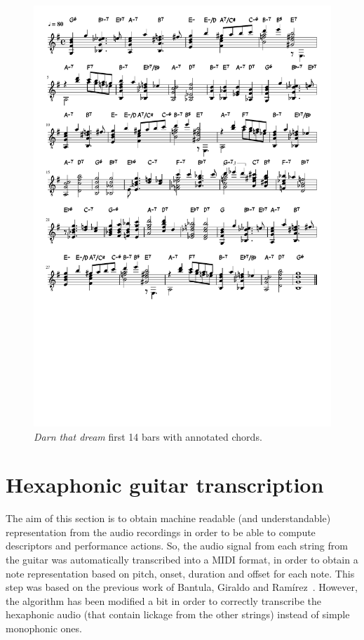 \begin{figure}[ht!]
    \centering
    \caption{\textit{Darn that dream} first 14 bars with annotated chords.}
    \label{fig:darn_score}
    
        \includegraphics[clip, trim=0cm 19cm 0cm 0cm, width=\textwidth]{Figures/Darn_that_dream.pdf}
    
\end{figure}

\section{Hexaphonic guitar transcription}
The aim of this section is to obtain machine readable (and understandable) representation from the audio recordings in order to be able to compute descriptors and performance actions. So, the audio signal from each string from the guitar was automatically transcribed into a MIDI format, in order to obtain a note representation based on pitch, onset, duration and offset for each note. This step was based on the previous work of Bantula, Giraldo and Ramírez~\cite{bantula2016}. However, the algorithm has been modified a bit in order to correctly transcribe the hexaphonic audio (that contain lickage from the other strings) instead of simple monophonic ones.

